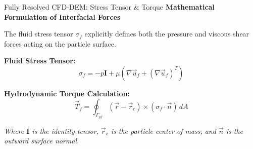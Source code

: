 \begin{frame}{Fully Resolved CFD-DEM: Stress Tensor \& Torque}
    \textbf{Mathematical Formulation of Interfacial Forces}
    \vspace{0.3cm}
    
    The fluid stress tensor $\sigma_{f}$ explicitly defines both the pressure and viscous shear forces acting on the particle surface.
    
    \vspace{0.2cm}
    \textbf{Fluid Stress Tensor:}
    $$ \sigma_{f} = -p \mathbf{I} + \mu \left( \nabla \vec{u}_{f} + (\nabla \vec{u}_{f})^T \right) $$
    
    \vspace{0.2cm}
    \textbf{Hydrodynamic Torque Calculation:}
    $$ \vec{T}_{f} = \oint_{\Gamma_{pf}} (\vec{r} - \vec{r}_{c}) \times (\sigma_{f} \cdot \vec{n}) \, dA $$
    
    \vspace{0.3cm}
    \small{\textit{Where $\mathbf{I}$ is the identity tensor, $\vec{r}_{c}$ is the particle center of mass, and $\vec{n}$ is the outward surface normal.}}
\end{frame}

%
%
%    

